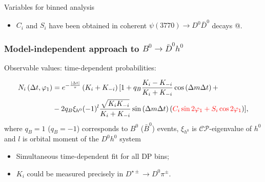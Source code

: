 \documentclass[10 pt,compress,mathserif]{beamer}
\newcommand{\cpconj}{\ensuremath{\mathcal{CP}}\xspace}
\newcommand{\bdh}{\ensuremath{B^0\to \bar D^0h^0}\xspace}
\begin{document}
\begin{frame}[containsverbatim]
\begin{block}{Variables for binned analysis}
 \end{block}

  \begin{itemize}
   \item $C_i$ and $S_i$ have been obtained in coherent $\psi(3770)\to D^0\bar D^0$ decays @. %
  \end{itemize}
\end{frame}


\begin{frame}
 \frametitle{Model-independent approach to \bdh}
 Observable values: time-dependent probabilities:
 
 \begin{equation*}
 \begin{split}
  N_i\left(\Delta t,\varphi_1\right) &= e^{-\frac{\left|\Delta t\right|}{\tau}}\left(K_{i}+K_{-i}\right)[ 1 + q_{B}\frac{K_{i}-K_{-i}}{K_{i}+K_{-i}}\cos\left(\Delta m\Delta t\right)+\\
  &-2q_{B}\xi_{h^0}(-1)^l\frac{\sqrt{K_iK_{-i}}}{K_{i}+K_{-i}}\sin\left(\Delta m\Delta t\right)\left(\textcolor{red}{C_i\sin2\varphi_1+S_i\cos2\varphi_1}\right)],
 \end{split}
 \end{equation*}
 where $q_B= 1$ ($q_B= -1$) corresponds to $B^0$ ($\bar B^0$) events, $\xi_{h^0}$ is \cpconj-eigenvalue of $h^0$ and $l$ is orbital moment of the $D^0h^0$ system
 
 \begin{itemize}
  \item Simultaneous time-dependent fit for all DP bins;
  \item $K_i$ could be measured precisely in $D^{\star\pm}\to D^0\pi^{\pm}$.
 \end{itemize}
\end{frame}
\end{document}
